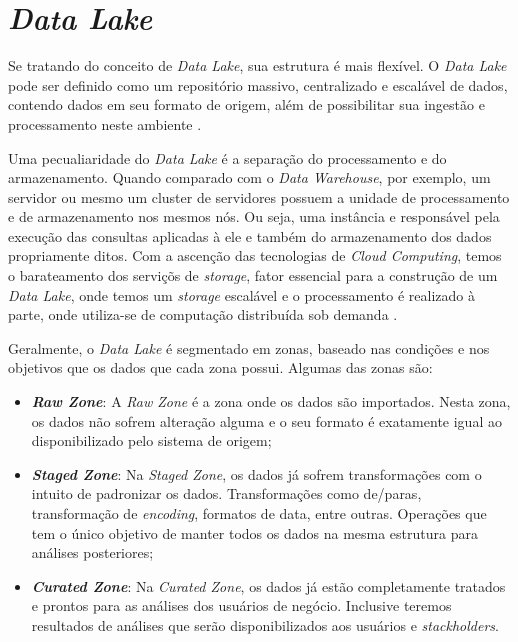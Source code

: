 \section{\textit{Data Lake}} Se tratando do conceito de \textit{Data Lake}, sua estrutura é mais flexível. O \textit{Data Lake} pode ser definido como um repositório massivo, centralizado e escalável de dados, contendo dados em seu formato de origem, além de possibilitar sua ingestão e processamento neste ambiente \cite{bigdatafastdatadatalake}. 

Uma pecualiaridade do \textit{Data Lake} é a separação do processamento e do armazenamento. Quando comparado  com o \textit{Data Warehouse}, por exemplo, um servidor ou mesmo um cluster de servidores possuem a unidade de processamento e de armazenamento nos mesmos nós. Ou seja, uma instância e responsável pela execução das consultas aplicadas à ele e também do armazenamento dos dados propriamente ditos. Com a ascenção das tecnologias de \textit{Cloud Computing}, temos o barateamento dos serviçõs de \textit{storage}, fator essencial para a construção de um \textit{Data Lake}, onde temos um \textit{storage} escalável e o processamento é realizado à parte, onde utiliza-se de computação distribuída sob demanda \cite{datalakeforenterprises}. 

Geralmente, o \textit{Data Lake} é segmentado em zonas, baseado nas condições e nos objetivos que os dados que cada zona possui. Algumas das zonas são:

\begin{itemize}
 \item \textbf{\textit{Raw Zone}}: A \textit{Raw Zone} é a zona onde os dados são importados. Nesta zona, os dados não sofrem alteração alguma e o seu formato é exatamente igual ao disponibilizado pelo sistema de origem; 
 \item \textbf{\textit{Staged Zone}}: Na \textit{Staged Zone}, os dados já sofrem transformações com o intuito de padronizar os dados. Transformações como de/paras, transformação de \textit{encoding}, formatos de data, entre outras. Operações que tem o único objetivo de manter todos os dados na mesma estrutura para análises posteriores;
 \item \textbf{\textit{Curated Zone}}: Na \textit{Curated Zone}, os dados já estão completamente tratados e prontos para as análises dos usuários de negócio. Inclusive teremos resultados de análises que serão disponibilizados aos usuários e \textit{stackholders}.
 \end{itemize}
 
